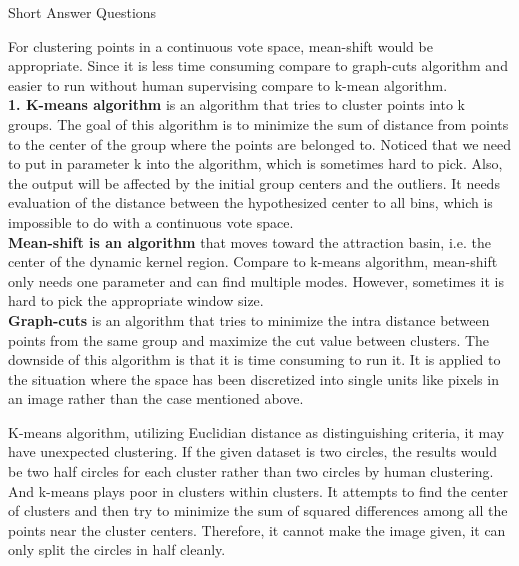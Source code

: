 \documentclass[a4paper,12pt]{article}
\begin{document}
\begin{section}{Short Answer Questions}

\begin{subsection}{1}
For clustering points in a continuous vote space, mean-shift would be appropriate. Since it is less time consuming compare to graph-cuts algorithm and easier to run without human supervising compare to k-mean algorithm.
\\

\textbf{1.	K-means algorithm} is an algorithm that tries to cluster points into k groups. The goal of this algorithm is to minimize the sum of distance from points to the center of the group where the points are belonged to. Noticed that we need to put in parameter k into the algorithm, which is sometimes hard to pick. Also, the output will be affected by the initial group centers and the outliers. It needs evaluation of the distance between the hypothesized center to all bins, which is impossible to do with a continuous vote space. 
\\
\textbf{Mean-shift is an algorithm} that moves toward the attraction basin, i.e. the center of the dynamic kernel region.    Compare to k-means algorithm, mean-shift only needs one parameter and can find multiple modes. However, sometimes it is hard to pick the appropriate window size. 
\\
\textbf{Graph-cuts} is an algorithm that tries to minimize the intra distance between points from the same group and maximize the cut value between clusters. The downside of this algorithm is that it is time consuming to run it. It is applied to the situation where the space has been discretized into single units like pixels in an image rather than the case mentioned above.
\\
\end{subsection}


\begin{subsection}{2}

 K-means algorithm, utilizing Euclidian distance as distinguishing criteria, it may have unexpected clustering. If the given dataset is two circles, the results would be two half circles for each cluster rather than two circles by human clustering. And k-means plays poor in clusters within clusters. It attempts to find the center of clusters and then try to minimize the sum of squared differences among all the points near the cluster centers. Therefore, it cannot make the image given, it can only split the circles in half cleanly.


\end{subsection}
\end{section}
\end{document}
